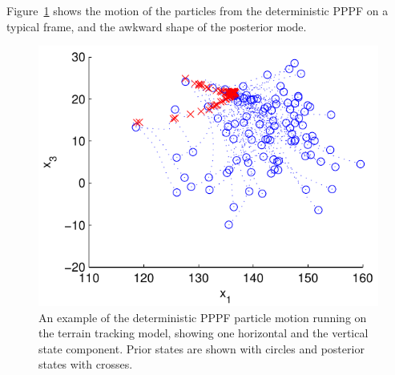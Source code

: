 \documentclass{article}
\begin{document}
Figure~\ref{fig:drone_example_frame_deterministic} shows the motion of the particles from the deterministic PPPF on a typical frame, and the awkward shape of the posterior mode.
%
\begin{figure}
\centering
\includegraphics[width=0.7\columnwidth]{drone_example_frame_deter.pdf}
\caption{An example of the deterministic PPPF particle motion running on the terrain tracking model, showing one horizontal and the vertical state component. Prior states are shown with circles and posterior states with crosses.}
\label{fig:drone_example_frame_deterministic}
\end{figure}
\end{document}
